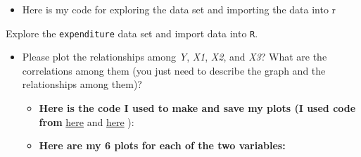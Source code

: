 \documentclass[12pt,letterpaper]{article}
\begin{document}
\begin{itemize}
	\item Here is my code for exploring the data set and importing the data into r
	
 

\end{itemize}

\vspace{.5cm}
\noindent Explore the \texttt{expenditure} data set and import data into \texttt{R}.
\vspace{.5cm}
  
\vspace{.5cm}
\begin{itemize}

\item
Please plot the relationships among \emph{Y}, \emph{X1}, \emph{X2}, and \emph{X3}? What are the correlations among them (you just need to describe the graph and the relationships among them)?
	\begin{itemize}
	\item \textbf{Here is the code I used to make and save my plots (I used code from}
	\href{https://thomasleeper.com/Rcourse/Tutorials/plotcolors.html}{here} and \href{https://bookdown.org/ndphillips/YaRrr/saving-plots-to-a-file-with-pdf-jpeg-and-png.html}{here} ):
	
	 
	
	\item \textbf{Here are my 6 plots for each of the two variables:}
	

\end{itemize}
\end{itemize}
\end{document}
